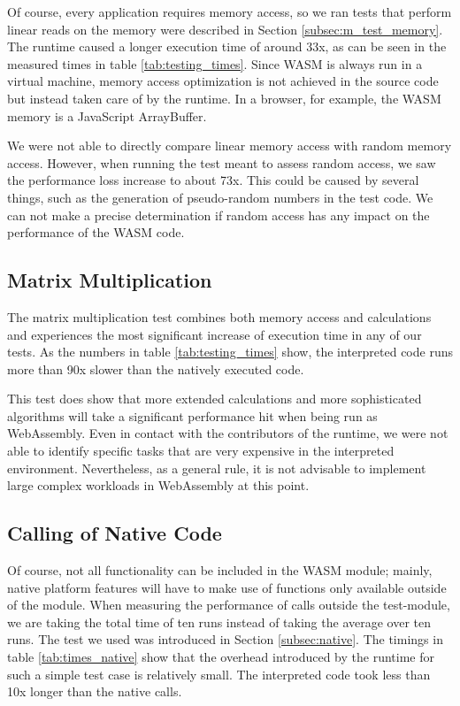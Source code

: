 Of course, every application requires memory access, so we ran tests that perform linear reads on the memory were described in Section \ref{subsec:m_test_memory}. The runtime caused a longer execution time of around 33x, as can be seen in the measured times in table \ref{tab:testing_times}. Since WASM is always run in a virtual machine, memory access optimization is not achieved in the source code but instead taken care of by the runtime. In a browser, for example, the WASM memory is a JavaScript ArrayBuffer.

We were not able to directly compare linear memory access with random memory access. However, when running the test meant to assess random access, we saw the performance loss increase to about 73x. This could be caused by several things, such as the generation of pseudo-random numbers in the test code. We can not make a precise determination if random access has any impact on the performance of the WASM code.

\subsection{Matrix Multiplication}

The matrix multiplication test combines both memory access and calculations and experiences the most significant increase of execution time in any of our tests. As the numbers in table \ref{tab:testing_times} show, the interpreted code runs more than 90x slower than the natively executed code.

This test does show that more extended calculations and more sophisticated algorithms will take a significant performance hit when being run as WebAssembly. Even in contact with the contributors of the runtime, we were not able to identify specific tasks that are very expensive in the interpreted environment. Nevertheless, as a general rule, it is not advisable to implement large complex workloads in WebAssembly at this point.

\subsection{Calling of Native Code}
Of course, not all functionality can be included in the WASM module; mainly, native platform features will have to make use of functions only available outside of the module. When measuring the performance of calls outside the test-module, we are taking the total time of ten runs instead of taking the average over ten runs. The test we used was introduced in Section \ref{subsec:native}. The timings in table \ref{tab:times_native} show that the overhead introduced by the runtime for such a simple test case is relatively small. The interpreted code took less than 10x longer than the native calls.


